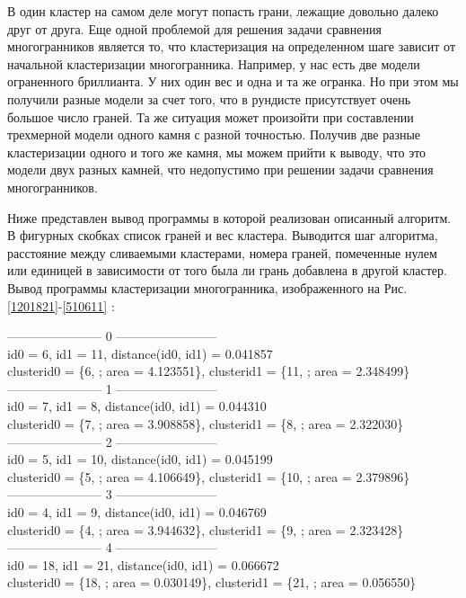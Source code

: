 \documentclass[a4paper,12pt, titlepage]{article}
\begin{document}
В один кластер на самом деле могут попасть грани, лежащие довольно далеко друг от друга. Еще одной проблемой для решения 
задачи сравнения многогранников является то, что кластеризация на определенном шаге зависит от начальной кластеризации 
многогранника. Например, у нас есть две модели  ограненного бриллианта. У них один вес и одна и та же огранка.
Но при этом мы получили разные модели за счет того, что в рундисте присутствует очень большое число граней. Та же ситуация может 
произойти при составлении трехмерной модели одного камня с разной точностью. Получив две разные кластеризации одного и 
того же камня, мы можем прийти к выводу, что это модели двух разных камней, что недопустимо при решении задачи сравнения 
многогранников.  

Ниже представлен вывод программы в которой реализован описанный алгоритм. В фигурных скобках список граней и вес кластера.
Выводится шаг алгоритма, расстояние между сливаемыми кластерами, номера граней, помеченные нулем или единицей в зависимости от 
того была ли грань добавлена в другой кластер.
\newpage
Вывод программы кластеризации многогранника, изображенного на Рис.\ref{1201821}-\ref{510611} :

-----------------------    0    ------------------------\\
id0 = 6, id1 = 11, distance(id0, id1) = 0.041857\\
clusterid0 = \{6, ; area = 4.123551\}, clusterid1 = \{11, ; area = 2.348499\}\\
-----------------------    1    ------------------------\\
id0 = 7, id1 = 8, distance(id0, id1) = 0.044310\\
clusterid0 = \{7, ; area = 3.908858\}, clusterid1 = \{8, ; area = 2.322030\}\\
-----------------------    2    ------------------------\\
id0 = 5, id1 = 10, distance(id0, id1) = 0.045199\\
clusterid0 = \{5, ; area = 4.106649\}, clusterid1 = \{10, ; area = 2.379896\}\\
-----------------------    3    ------------------------\\
id0 = 4, id1 = 9, distance(id0, id1) = 0.046769\\
clusterid0 = \{4, ; area = 3.944632\}, clusterid1 = \{9, ; area = 2.323428\}\\
-----------------------    4    ------------------------\\
id0 = 18, id1 = 21, distance(id0, id1) = 0.066672\\
clusterid0 = \{18, ; area = 0.030149\}, clusterid1 = \{21, ; area = 0.056550\}\\
\end{document}
